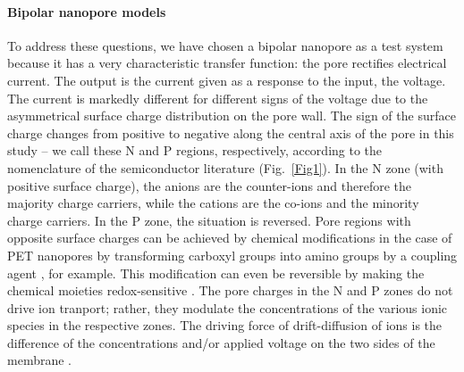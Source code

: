 \documentclass[fleqn,10pt]{SelfArx} %
\begin{document}
\paragraph*{Bipolar nanopore models}
To address these questions, we have chosen a bipolar nanopore as a test system because it has a very characteristic transfer function: the pore rectifies electrical current.
The output is the current given as a response to the input, the voltage.
The current is markedly different for different signs of the voltage due to the asymmetrical surface charge distribution on the pore wall. 
The sign of the surface charge changes from positive to negative along the central axis of the pore in this study -- we call these N and P regions, respectively, according to the nomenclature of the semiconductor literature (Fig.\ \ref{Fig1}).
In the N zone (with positive surface charge), the anions are the counter-ions and therefore the majority charge carriers, while the cations are the co-ions and the minority charge carriers.
In the P zone, the situation is reversed.
Pore regions with opposite surface charges can be achieved by chemical modifications in the case of PET nanopores by transforming carboxyl groups into amino groups by a coupling agent \cite{vlassiouk_nl_2007}, for example. 
This modification can even be reversible by making the chemical moieties redox-sensitive \cite{ali_sabc_2017}.
The pore charges in the N and P zones do not drive ion tranport; rather, they modulate the concentrations of the various ionic species in the respective zones. 
The driving force of drift-diffusion of ions is the difference of the concentrations and/or applied voltage on the two sides of the membrane \cite{lynden_Bell_jcp_1996,chen_bj_1997,1998_nonner_bj_1287,kurnikova_bj_1999,cardenas_bj_2000,gillespie_jpcm_2002,im_jmb_2002,gillespie-jpcb-109-15598-2005,peter_bj_2005,cervera_epl_2005,cervera_jcp_2006,mamonov_bj_2006,constantin_pre_2007,vlassiouk_nl_2008,gillespie-bj-95-609-2008,he-jacs-131-5194-2009,song_plosone_2011,cervera_ea_2011}.
\end{document}
